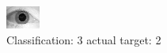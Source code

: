 \begin{figure}[h!]
\begin{center}
\includegraphics[width=0.60\columnwidth]{figures/ID1604_class_3_target_2.png}
\end{center}
\caption{ Classification: 3 actual target: 2}
\label{fig:ID1604_class_3_target_2}
\end{figure}

